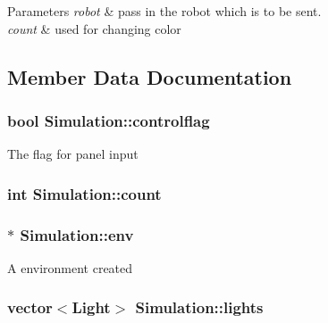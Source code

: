 \begin{DoxyParams}{Parameters}
{\em robot} & pass in the robot which is to be sent. \\
\hline
{\em count} & used for changing color \\
\hline
\end{DoxyParams}


\subsection{Member Data Documentation}
\hypertarget{classSimulation_a99785aef857b01f3056bada702b53d20}{
\subsubsection[{controlflag}]{\setlength{\rightskip}{0pt plus 5cm}bool Simulation\-::controlflag\hspace{0.3cm}{\ttfamily [private]}}}\label{classSimulation_a99785aef857b01f3056bada702b53d20}
The flag for panel input \hypertarget{classSimulation_a5a5e26d75c6a6dee8cdfecc7669545e3}{
\subsubsection[{count}]{\setlength{\rightskip}{0pt plus 5cm}int Simulation\-::count\hspace{0.3cm}{\ttfamily [private]}}}\label{classSimulation_a5a5e26d75c6a6dee8cdfecc7669545e3}
\hypertarget{classSimulation_adb82ccf6c2a4b78c73987857f5362a35}{
\subsubsection[{env}]{$\ast$ Simulation\-::env\hspace{0.3cm}{\ttfamily [private]}}}\label{classSimulation_adb82ccf6c2a4b78c73987857f5362a35}
A environment created \hypertarget{classSimulation_a4f6efa5f1bb16876c98f134fe80e9278}{
\subsubsection[{lights}]{\setlength{\rightskip}{0pt plus 5cm}vector$<${\bf Light}$>$ Simulation\-::lights\hspace{0.3cm}{\ttfamily [private]}}}\label{classSimulation_a4f6efa5f1bb16876c98f134fe80e9278}
